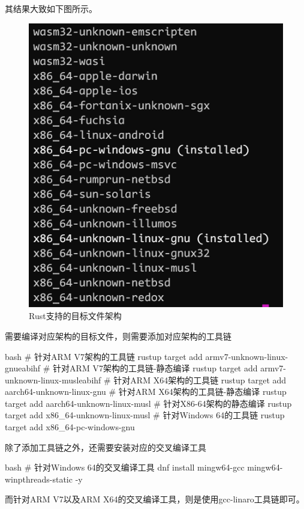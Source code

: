 其结果大致如下图所示。
\begin{figure}[H]
  \centering
  \includegraphics[scale=0.5]{rust_target.png}
  \caption{Rust支持的目标文件架构}
  \label{fig:rust_target}
\end{figure}

需要编译对应架构的目标文件，则需要添加对应架构的工具链
\begin{code-block}{bash}
# 针对ARM V7架构的工具链
rustup target add armv7-unknown-linux-gnueabihf
# 针对ARM V7架构的工具链-静态编译
rustup target add armv7-unknown-linux-musleabihf
# 针对ARM X64架构的工具链
rustup target add aarch64-unknown-linux-gnu
# 针对ARM X64架构的工具链-静态编译
rustup target add aarch64-unknown-linux-musl
# 针对X86-64架构的静态编译
rustup target add x86_64-unknown-linux-musl
# 针对Windows 64的工具链
rustup target add x86_64-pc-windows-gnu
\end{code-block}

除了添加工具链之外，还需要安装对应的交叉编译工具
\begin{code-block}{bash}
# 针对Windows 64的交叉编译工具
dnf install mingw64-gcc mingw64-winpthreads-static -y
\end{code-block}

而针对ARM V7以及ARM X64的交叉编译工具，则是使用gcc-linaro工具链即可。

